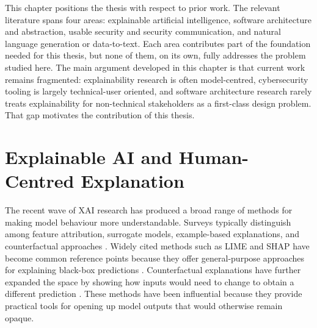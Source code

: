 
This chapter positions the thesis with respect to prior work. The relevant literature spans four areas: explainable artificial intelligence, software architecture and abstraction, usable security and security communication, and natural language generation or data-to-text. Each area contributes part of the foundation needed for this thesis, but none of them, on its own, fully addresses the problem studied here. The main argument developed in this chapter is that current work remains fragmented: explainability research is often model-centred, cybersecurity tooling is largely technical-user oriented, and software architecture research rarely treats explainability for non-technical stakeholders as a first-class design problem. That gap motivates the contribution of this thesis.

\section{Explainable AI and Human-Centred Explanation}

The recent wave of XAI research has produced a broad range of methods for making model behaviour more understandable. Surveys typically distinguish among feature attribution, surrogate models, example-based explanations, and counterfactual approaches \cite{guidotti2018survey, barredo2020xai}. Widely cited methods such as LIME and SHAP have become common reference points because they offer general-purpose approaches for explaining black-box predictions \cite{ribeiro2016should, lundberg2017unified}. Counterfactual explanations have further expanded the space by showing how inputs would need to change to obtain a different prediction \cite{wachter2017counterfactual}. These methods have been influential because they provide practical tools for opening up model outputs that would otherwise remain opaque.

